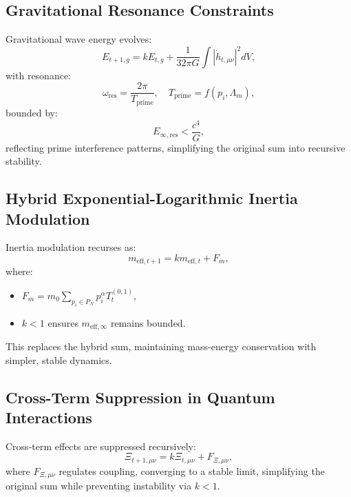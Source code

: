 \documentclass{article}
\theoremstyle{plain}
\begin{document}
\subsection{Gravitational Resonance Constraints}
\label{subsec:gravitational_resonance}

Gravitational wave energy evolves:
\begin{equation}
    E_{t+1,g} = k E_{t,g} + \frac{1}{32\pi G} \int |\dot{h}_{t,\mu\nu}|^2 dV,
\end{equation}
with resonance:
\begin{equation}
    \omega_{\text{res}} = \frac{2\pi}{T_{\text{prime}}}, \quad T_{\text{prime}} = f(p_i, \Lambda_m),
\end{equation}
bounded by:
\begin{equation}
    E_{\infty,\text{res}} < \frac{c^4}{G},
\end{equation}
reflecting prime interference patterns, simplifying the original sum into recursive stability.

\subsection{Hybrid Exponential-Logarithmic Inertia Modulation}
\label{subsec:inertia_modulation}

Inertia modulation recurses as:
\begin{equation}
    m_{\text{eff},t+1} = k m_{\text{eff},t} + F_m,
\end{equation}
where:
\begin{itemize}
    \item \( F_m = m_0 \sum_{p_i \in P_N} p_i^\alpha T_{t}^{(0,1)} \),
    \item \( k < 1 \) ensures \( m_{\text{eff},\infty} \) remains bounded.
\end{itemize}
This replaces the hybrid sum, maintaining mass-energy conservation with simpler, stable dynamics.

\subsection{Cross-Term Suppression in Quantum Interactions}
\label{subsec:cross_term_suppression}

Cross-term effects are suppressed recursively:
\begin{equation}
    \Xi_{t+1,\mu\nu} = k \Xi_{t,\mu\nu} + F_{\Xi,\mu\nu},
\end{equation}
where \( F_{\Xi,\mu\nu} \) regulates coupling, converging to a stable limit, simplifying the original sum while preventing instability via \( k < 1 \).
\end{document}
